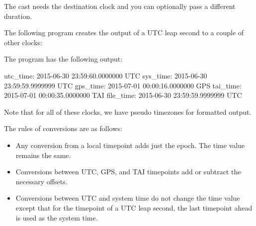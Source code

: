 The cast needs the destination clock and you can optionally pass a different duration.

The following program creates the output of a UTC leap second to a couple of other clocks:



The program has the following output:

\begin{shell}
utc_time: 2015-06-30 23:59:60.0000000 UTC
sys_time: 2015-06-30 23:59:59.9999999 UTC
gps_time: 2015-07-01 00:00:16.0000000 GPS
tai_time: 2015-07-01 00:00:35.0000000 TAI
file_time: 2015-06-30 23:59:59.9999999 UTC
\end{shell}

Note that for all of these clocks, we have pseudo timezones for formatted output.

The rules of conversions are as follows:

\begin{itemize}
\item 
Any conversion from a local timepoint adds just the epoch. The time value remains the same.

\item 
Conversions between UTC, GPS, and TAI timepoints add or subtract the necessary offsets.

\item 
Conversions between UTC and system time do not change the time value except that for the timepoint of a UTC leap second, the last timepoint ahead is used as the system time.
\end{itemize}


